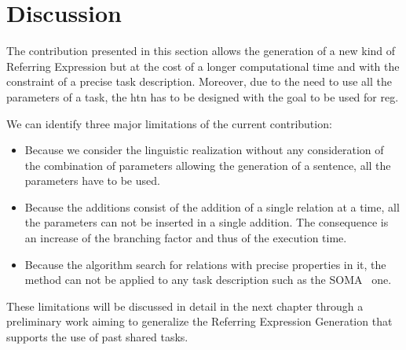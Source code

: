 
\section{Discussion}

The contribution presented in this section allows the generation of a new kind of Referring Expression but at the cost of a longer computational time and with the constraint of a precise task description. Moreover, due to the need to use all the parameters of a task, the \acrshort{htn} has to be designed with the goal to be used for \acrshort{reg}.

We can identify three major limitations of the current contribution:
\begin{itemize}
  \item Because we consider the linguistic realization without any consideration of the combination of parameters allowing the generation of a sentence, all the parameters have to be used.
  \item Because the additions consist of the addition of a single relation at a time, all the parameters can not be inserted in a single addition. The consequence is an increase of the branching factor and thus of the execution time.
  \item Because the algorithm search for relations with precise properties in it, the method can not be applied to any task description such as the SOMA~\cite{bessler_2020_foundations} one.
\end{itemize}

These limitations will be discussed in detail in the next chapter through a preliminary work aiming to generalize the Referring Expression Generation that supports the use of past shared tasks.